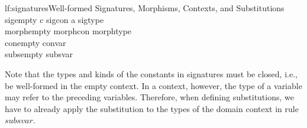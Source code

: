 \begin{fignd}{lf:signatures}{Well-formed Signatures, Morphisms, Contexts, and Substitutions}
\ianc{}
     {\issig{\cdot}}
     {sigempty}
\tb\tb
\icnc{\issig{\Sigma}}
     {c \mnot\minn \Sigma}
     {}
     {}
     {sigcon}
\tb\tb
\icnc{\issig{\Sigma}}
     {a \mnot\minn \Sigma}
     {}
     {}
     {sigtype}
\\
     {}
     {morphempty}
\tb\tb
{}
     {}
     {}
     {morphcon}
\tb\tb
{}
     {}
     {}
     {morphtype}
\\
\ianc{\issig{\Sigma}}
     {\isdcont{\Sigma}{\cdot}}
     {conempty}
\tb\tb
\ibnc{\isdcont{\Sigma}{\Gamma}}
     {}
     {}
     {convar}
\\
     {}
     {subsempty}
\tb\tb
{}
     {}
     {}
     {subsvar}
\end{fignd}

Note that the types and kinds of the constants in signatures must be closed, i.e., be well-formed in the empty context. In a context, however, the type of a variable may refer to the preceding variables. Therefore, when defining substitutions, we have to already apply the substitution to the types of the domain context in rule $subsvar$.



